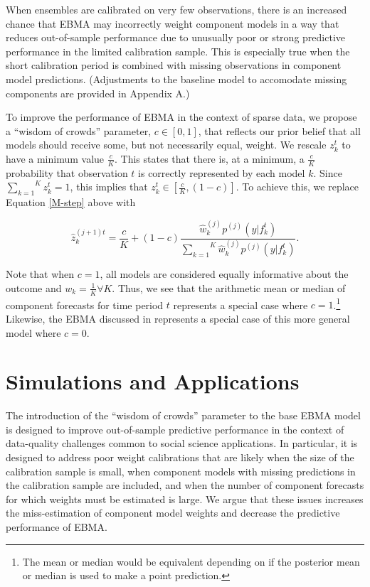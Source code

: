 \documentclass[12pt,fullpage,endnotes]{article}
\begin{document}
When ensembles are calibrated on very few observations, there is an
increased chance that EBMA may incorrectly weight component models in
a way that reduces out-of-sample performance due to unusually poor or
strong predictive performance in the limited calibration sample. This
is especially true when the short calibration period is combined with
missing observations in component model predictions.  (Adjustments to
the baseline model to accomodate missing components are provided in
Appendix A.)

To improve the performance of EBMA in the context of sparse data, we
propose a ``wisdom of crowds'' parameter, $c \in [0,1]$, that reflects
our prior belief that all models should receive some, but not
necessarily equal, weight. We rescale $z^t_k$ to have a minimum value
$\frac{c}{K}$.  This states that there is, at a minimum, a
$\frac{c}{K}$ probability that observation $t$ is correctly
represented by each model $k$.  Since
$\overset{K}{\underset{k=1}{\sum}} z_k^t = 1$, this implies that
$z_k^t \in [\frac{c}{K}, (1-c)]$.  To achieve this, we replace
Equation \eqref{M-step} above with

\begin{equation}
\hat{z}^{(j+1)t}_{k} = \frac{c}{K} + (1-c)\frac{\hat{w}^{(j)}_k
p^{(j)}(y|f_{k}^{t})}{\overset{K}{\underset{k=1}{\sum}}\hat{w}^{(j)}_kp^{(j)}(y|f_{k}^{t})}.
\end{equation}

Note that when $c=1$, all models are considered equally informative
about the outcome and $w_k=\frac{1}{K} \forall K$. Thus, we see that
the arithmetic mean or median of component forecasts for time period
$t$ represents a special case where $c=1$.\footnote{The mean
  or median would be equivalent depending on if the posterior mean or
  median is used to make a point prediction.}  Likewise, the EBMA
discussed in \citet{mhw:2012} represents a special case of this more
general model where $c=0$.

\section{Simulations and Applications}
\label{empirics}

The introduction of the ``wisdom of crowds'' parameter to the base
EBMA model is designed to improve out-of-sample predictive performance
in the context of data-quality challenges common to social science
applications. In particular, it is designed to address poor weight
calibrations that are likely when the size of the calibration sample
is small, when component models with missing predictions in the calibration sample are included, and
when the number of component forecasts for which weights must be estimated
is large.  We argue that these issues increases the miss-estimation of
component model weights and decrease the predictive performance of
EBMA.
\end{document}
